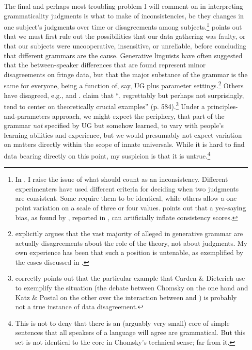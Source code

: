  The final and perhaps most troubling problem I will comment on in interpreting grammaticality judgments is what to make of inconsistencies, be  they changes in one subject's judgments over time or disagreements among subjects.\footnote{In , I raise the issue of what should count as an inconsistency. Different experimenters have used different criteria for deciding when two judgments are consistent. Some require them to be identical, while others allow a one-point variation on a scale of three or four values. \citet{Birdsong1989}
 points out that a yea-saying bias, as found by \citet{Mohan1977}, reported in , can artificially inflate consistency scores.
 }
 \citet{Fillmore1979} points out that we must first rule out the possibilities that our data gathering was faulty, or that our subjects were uncooperative, insensitive, or unreliable, before  concluding that different grammars are the cause. Generative linguists have often suggested that the between-speaker differences that  are found represent minor disagreements on fringe data, but that the major substance of the grammar is the same for everyone, being a function of, say, UG plus parameter settings.\footnote{\citet{Newmeyer1983} explicitly argues that the vast majority of alleged  in generative grammar are actually disagreements about the role of the theory, not about judgments. My own experience has been that such a position is untenable, as exemplified by the cases discussed in .}
  Others have disagreed, e.g., \citet{Grandy1981} and \citet{Levelt1972}. \citet{CardenEtAl1981} claim that ``, regrettably  but perhaps not
 surprisingly, tend to center on theoretically crucial examples'' (p. 584).\footnote{\citet{Newmeyer1983} correctly points out that the particular example that Carden \& Dieterich use to exemplify the situation (the debate between Chomsky on the one hand and Katz \& Postal on the other over the interaction between  and ) is probably not a true instance of data disagreement.}
 Under a principles-and-parameters approach, we might expect the periphery, that part of the grammar \textit{not} specified by UG but somehow learned, to vary with people's learning abilities and experience, but we would presumably not expect variation on matters directly within the scope of innate universals. While it is hard to find data bearing directly on this point, my suspicion is that it is untrue.\footnote{This is not to deny that there is an (arguably very small) core of simple sentences that all speakers of a language will agree are grammatical. But this set is not identical to the core in Chomsky's technical sense; far from it.}
